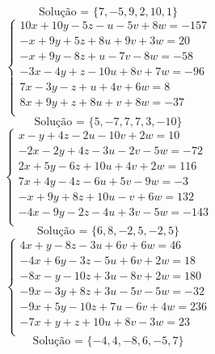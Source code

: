\documentclass[12pt,oneside,a4paper]{article}
\begin{document}
\begin{equation*}
\text{Solução = }\{7,-5,9,2,10,1\}
\end{equation*}
\vspace{\baselineskip}
\begin{equation*}
\begin{cases}
10x+10y-5z-u-5v+8w=-157 \\
-x+9y+5z+8u+9v+3w=20 \\
-x+9y-8z+u-7v-8w=-58 \\
-3x-4y+z-10u+8v+7w=-96 \\
7x-3y-z+u+4v+6w=8 \\
8x+9y+z+8u+v+8w=-37 \\
\end{cases}
\end{equation*}
\begin{equation*}
\text{Solução = }\{5,-7,7,7,3,-10\}
\end{equation*}
\vspace{\baselineskip}
\begin{equation*}
\begin{cases}
x-y+4z-2u-10v+2w=10 \\
-2x-2y+4z-3u-2v-5w=-72 \\
2x+5y-6z+10u+4v+2w=116 \\
7x+4y-4z-6u+5v-9w=-3 \\
-x+9y+8z+10u-v+6w=132 \\
-4x-9y-2z-4u+3v-5w=-143 \\
\end{cases}
\end{equation*}
\begin{equation*}
\text{Solução = }\{6,8,-2,5,-2,5\}
\end{equation*}
\vspace{\baselineskip}
\begin{equation*}
\begin{cases}
4x+y-8z-3u+6v+6w=46 \\
-4x+6y-3z-5u+6v+2w=18 \\
-8x-y-10z+3u-8v+2w=180 \\
-9x-3y+8z+3u-5v-5w=-32 \\
-9x+5y-10z+7u-6v+4w=236 \\
-7x+y+z+10u+8v-3w=23 \\
\end{cases}
\end{equation*}
\begin{equation*}
\text{Solução = }\{-4,4,-8,6,-5,7\}
\end{equation*}
\end{document}
